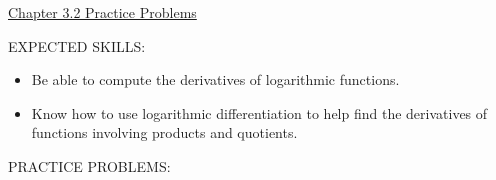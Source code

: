\documentclass[12pt]{article}
\begin{document}
\begin{center}
\underline{\LARGE{Chapter 3.2 Practice Problems}}
\end{center}

\noindent EXPECTED SKILLS:

\begin{itemize}

\item Be able to compute the derivatives of logarithmic functions.

\item Know how to use logarithmic differentiation to help find the derivatives of functions involving products and quotients.

\end{itemize}

\noindent PRACTICE PROBLEMS:

\bigskip

\end{document}
